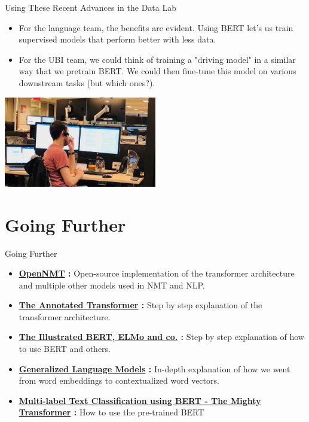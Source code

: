 \documentclass[aspectratio=169]{beamer}
\begin{document}
\begin{frame}{Using These Recent Advances in the Data Lab}
\begin{itemize}
	\item For the language team, the benefits are evident. Using BERT let's us train supervised models that perform better with less data.
	\item For the UBI team, we could think of training a "driving model" in a similar way that we pretrain BERT. We could then fine-tune this model on various downstream tasks (but which ones?).
\end{itemize}

\centering
\includegraphics[width=0.5\textwidth]{figures/datalab}
\end{frame}

\section{Going Further}

\begin{frame}{Going Further}

\begin{itemize}
	\item \textbf{\href{http://opennmt.net/}{OpenNMT} : } Open-source implementation of the transformer architecture and multiple other models used in NMT and NLP.
	\item \textbf{\href{http://nlp.seas.harvard.edu/2018/04/03/attention.html}{The Annotated Transformer} : } Step by step explanation of the transformer architecture.
	\item \textbf{\href{http://jalammar.github.io/illustrated-bert/}{The Illustrated BERT, ELMo and co.} :} Step by step explanation of how to use BERT and others.
	\item \textbf{\href{https://lilianweng.github.io/lil-log/2019/01/31/generalized-language-models.html}{Generalized Language Models} :} In-depth explanation of how we went from word embeddings to contextualized word vectors.
	\item \textbf{\href{https://medium.com/huggingface/multi-label-text-classification-using-bert-the-mighty-transformer-69714fa3fb3d}{Multi-label Text Classification using BERT - The Mighty Transformer} :} How to use the pre-trained BERT
\end{itemize}

\end{frame}
\end{document}
